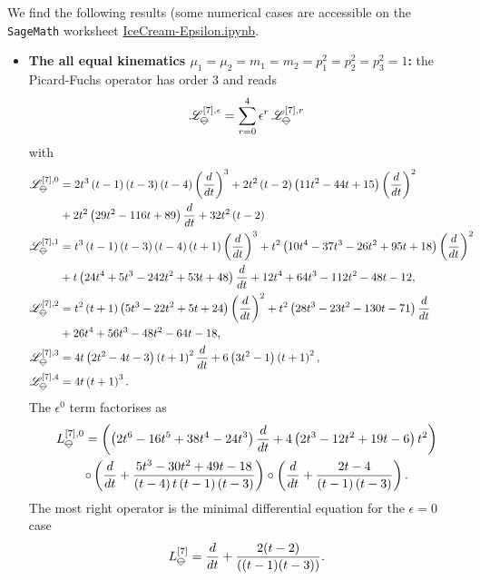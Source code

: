 \documentclass[a4paper,12pt]{article}
\numberwithin{equation}{section}
\numberwithin{figure}{section}
\newcommand{\IceCream}{	\begin{tikzpicture}[scale=0.05]
	\draw[color = black, fill=none] (2,0) arc(0:180:2);
		\draw [black] (-2,0) to (2,0);
		\draw [black] (-2,0) to (0,-2);
                	\draw [black] (2,0) to (0,-2);
	\end{tikzpicture}}
\begin{document}
We find the following results (some numerical cases are accessible on
the {\tt
  SageMath} worksheet \href{IceCream-Epsilon.ipynb}{IceCream-Epsilon.ipynb}.
\begin{itemize}
	\item {\bf The all equal kinematics
		$\mu_1=\mu_2=m_1=m_2=p_1^2=p_2^2=p_3^2=1$:} the Picard-Fuchs operator
	has order 3 and
	reads
	\begin{equation}
		\mathscr{L}_{\IceCream}^{[7],\epsilon}=\sum_{r=0}^4 \epsilon^r\,\mathscr{L}_{\IceCream}^{[7],r}
	\end{equation}
	with
	\begin{align}
		\mathscr{L}_{\IceCream}^{[7],0}&= 2 t^{3} \left(t -1\right)
		\left(t -3\right) \left(t -4\right) \left(d\over dt\right)^{3}+2 t^{2} \left(t
		-2\right) \left(11 t^{2}-44 t +15\right) \left(d\over dt\right)^{2}\cr&+2 t^{2}
		\left(29 t^{2}-116 t +89\right) {d\over dt} +32 t^{2} \left(t
		-2\right)\cr
		\mathscr{L}_{\IceCream}^{[7],1}&=t^{3} \left(t -1\right) \left(t -3\right) \left(t -4\right) \left(t +1\right) \left(d\over dt\right)^{3}+t^{2} \left(10 t^{4}-37 t^{3}-26 t^{2}+95 t +18\right) \left(d\over dt\right)^{2}\cr&+t \left(24 t^{4}+5 t^{3}-242 t^{2}+53 t +48\right)  {d\over dt} +12 t^{4}+64 t^{3}-112 t^{2}-48 t -12,\cr
		\mathscr{L}_{\IceCream}^{[7],2}&=t^{2} \left(t +1\right) \left(5 t^{3}-22 t^{2}+5 t +24\right) \left(d\over dt\right)^{2}+t^{2} \left(28 t^{3}-23 t^{2}-130 t -71\right)  {d\over dt} \cr&+26 t^{4}+56 t^{3}-48 t^{2}-64 t -18,\cr
		\mathscr{L}_{\IceCream}^{[7],3}&=4 t \left(2 t^{2}-4 t -3\right) \left(t +1\right)^{2}
		{d\over dt}+6 \left(3 t^{2}-1\right) \left(t +1\right)^{2},\cr
		\mathscr{L}_{\IceCream}^{[7],4}&= 4 t \left(t +1\right)^{3}.
	\end{align}
	The $\epsilon^0$ term factorises as
	\begin{multline}
		L_{\IceCream}^{[7],0}=\left(
		\left(2 t^{6}-16 t^{5}+38 t^{4}-24 t^{3}\right) {{d\over dt}} +4 \left(2 t^{3}-12 t^{2}+19 t -6\right) t^{2}\right)\cr\circ
		\left(
		{{d\over dt}} +\frac{5 t^{3}-30 t^{2}+49 t -18}{\left(t -4\right) t \left(t -1\right) \left(t -3\right)}
		\right)\circ \left({{d\over dt}} +\frac{2 t -4}{\left(t -1\right) \left(t -3\right)}
		\right).
	\end{multline}
	The most right operator is the minimal differential equation for the
	$\epsilon=0$ case~\cite{Lairez:2022zkj}
	\begin{equation}
		L_{\IceCream}^{[7]}= {d\over dt}+ {2(t - 2)\over ((t - 1)(t - 3))  }.
	\end{equation}
	

\end{itemize}
\end{document}
